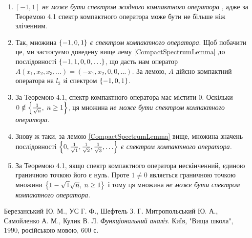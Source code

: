 \documentclass[12pt]{article} %
\begin{document}
\begin{enumerate}
	\renewcommand{\labelenumi}{\myralph{enumi})}
\item{$[-1,1]$ {\it не може бути спектром жодного компактного оператора}
	, адже за Теоремою 4.1 спектр компактного оператора може бути не більше ніж зліченним.}
	\item{Так, множина $\left\{-1,0,1\right\}$ {\it є спектром компактного оператора}. Щоб побачити це, ми застосуємо доведену вище лему
		\ref{CompactSpectrumLemma} до
		послідовності $\left\{-1,1,0,0,\hdots\right\}$, що дасть нам оператор $A(x_1,x_2,x_3,\hdots)=(-x_1,x_2,0,0,\hdots)$. За лемою, $A$
		дійсно компактний оператора на $l_2$ зі спектром $\left\{-1,0,1\right\}$.}
	\item{За Теоремою 4.1, спектр компактного оператора має містити 0. Оскільки $0\notin\left\{\frac{1}{\sqrt{n}},\;n\geq 1\right\}$, ця множина
		{\it не може бути спектром компактного оператора.}}
	\item{Знову ж таки, за лемою \ref{CompactSpectrumLemma} вище, множина значень послідовності
		$\left\{0,\frac{1}{\sqrt{1}},\frac{1}{\sqrt{2}},\frac{1}{\sqrt{3}},\hdots\right\}$ {\it є спектром компактного оператора.}}
	\item{За Теоремою 4.1, якщо спектр компактного оператора нескінченний, єдиною граничною точкою його є нуль. Проте $1\neq 0$ являється
		граничною точкою множини $\left\{1-\sqrt{1}{\sqrt{n}},\;n\geq 1\right\}$ і тому ця множина {\it 
		не може бути спектром компактного оператора.}}
\end{enumerate}
\begin{thebibliography}{9}
Березанський Ю. М., УС Г. Ф., Шефтель З. Г.
Митропольський Ю. А., Самойленко А. М., Кулик В. Л.
\emph{Функціональний аналіз}.
Київ, "Вища школа"{}, 1990, російською мовою, 600 с.
\end{thebibliography}
\end{document}
